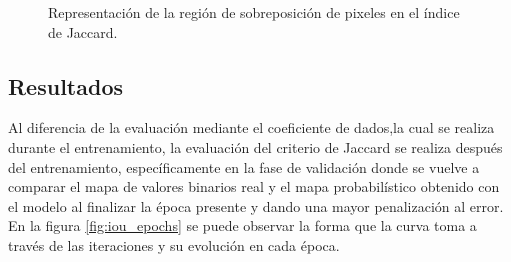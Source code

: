 \def\rectA{(0,0) rectangle (2,2)}
\def\rectB{(1,-1) rectangle (3,1)}

\begin{figure}[b]
    \centering
    \caption{Representación de la región de sobreposición de pixeles en el índice de Jaccard.}
\end{figure}


\subsection{Resultados}
Al diferencia de la evaluación mediante el coeficiente de dados,la cual se realiza durante el entrenamiento, la evaluación del criterio de Jaccard se realiza después del entrenamiento, específicamente en la fase de validación donde se vuelve a comparar el mapa de valores binarios real y el mapa probabilístico obtenido con el modelo al finalizar la época presente y dando una mayor penalización al error. En la figura \ref{fig:iou_epochs} se puede observar la forma que la curva toma a través de las iteraciones y su evolución en cada época.

